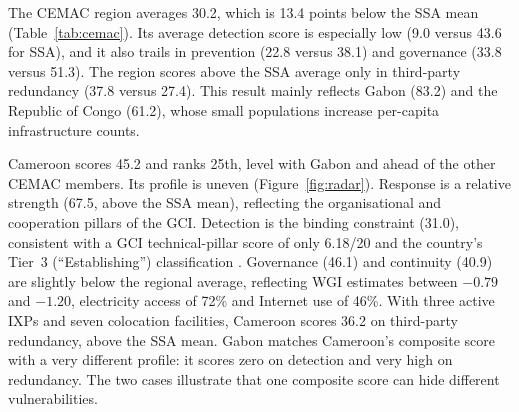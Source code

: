 \documentclass[11pt,a4paper]{article}
\begin{document}
The CEMAC region averages 30.2, which is 13.4 points below the SSA mean (Table~\ref{tab:cemac}). Its average detection score is especially low (9.0 versus 43.6 for SSA), and it also trails in prevention (22.8 versus 38.1) and governance (33.8 versus 51.3). The region scores above the SSA average only in third-party redundancy (37.8 versus 27.4). This result mainly reflects Gabon (83.2) and the Republic of Congo (61.2), whose small populations increase per-capita infrastructure counts.

Cameroon scores 45.2 and ranks 25th, level with Gabon and ahead of the other CEMAC members. Its profile is uneven (Figure~\ref{fig:radar}). Response is a relative strength (67.5, above the SSA mean), reflecting the organisational and cooperation pillars of the GCI. Detection is the binding constraint (31.0), consistent with a GCI technical-pillar score of only 6.18/20 and the country's Tier~3 (``Establishing'') classification \citep{ITU2024GCI}. Governance (46.1) and continuity (40.9) are slightly below the regional average, reflecting WGI estimates between $-0.79$ and $-1.20$, electricity access of 72\% and Internet use of 46\%. With three active IXPs and seven colocation facilities, Cameroon scores 36.2 on third-party redundancy, above the SSA mean. Gabon matches Cameroon's composite score with a very different profile: it scores zero on detection and very high on redundancy. The two cases illustrate that one composite score can hide different vulnerabilities.
\end{document}
